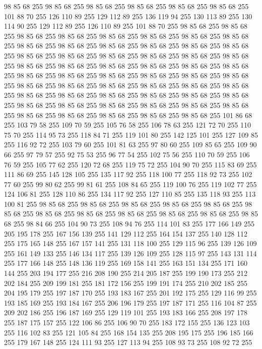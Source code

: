 98 85 68 255 98 85 68 255 98 85 68 255 98 85 68 255 98 85 68 255 98 85 68 255 101 88 70 255 126 110 89 255 129 112 89 255 136 119 94 255 130 113 89 255 130 114 90 255 129 112 89 255 126 110 89 255 101 88 70 255 98 85 68 255 98 85 68 255 98 85 68 255 98 85 68 255 98 85 68 255 98 85 68 255 98 85 68 255 98 85 68 255 98 85 68 255 98 85 68 255 98 85 68 255 98 85 68 255 98 85 68 255 98 85 68 255 98 85 68 255 98 85 68 255 98 85 68 255 98 85 68 255 98 85 68 255 98 85 68 255 98 85 68 255 98 85 68 255 98 85 68 255 98 85 68 255 98 85 68 255 98 85 68 255 98 85 68 255 98 85 68 255 98 85 68 255 98 85 68 255 98 85 68 255 98 85 68 255 98 85 68 255 98 85 68 255 98 85 68 255 98 85 68 255 98 85 68 255 98 85 68 255 98 85 68 255 98 85 68 255 98 85 68 255 98 85 68 255 98 85 68 255 98 85 68 255 98 85 68 255 98 85 68 255 98 85 68 255 98 85 68 255 98 85 68 255
98 85 68 255 98 85 68 255 98 85 68 255 98 85 68 255 98 85 68 255 98 85 68 255 101 86 68 255 103 79 58 255 109 70 59 255 105 76 58 255 106 78 63 255 121 72 70 255 110 75 70 255 114 95 73 255 118 84 71 255 119 101 80 255 142 125 101 255 127 109 85 255 116 92 72 255 103 79 60 255 101 81 63 255 97 80 60 255 109 85 65 255 109 90 66 255 97 79 57 255 92 75 53 255 96 77 54 255 102 75 56 255 110 70 59 255 106 76 59 255 105 77 62 255 120 72 68 255 119 75 72 255 104 90 70 255 115 83 69 255 111 86 69 255 145 128 105 255 135 117 92 255 118 100 77 255 118 92 73 255 102 77 60 255 99 80 62 255 99 81 61 255 108 84 65 255 119 100 76 255 119 102 77 255 124 106 81 255 128 110 86 255 134 117 92 255 127 110 85 255 135 118 93 255 113 100 81 255 98 85 68 255 98 85 68 255 98 85 68 255 98 85 68 255 98 85 68 255 98 85 68 255 98 85 68 255 98 85 68 255 98 85 68 255 98 85 68 255 98 85 68 255 98 85 68 255
98 84 66 255 104 90 73 255 108 94 76 255 114 101 83 255 177 166 149 255 205 195 178 255 167 156 139 255 141 129 112 255 164 154 137 255 140 128 112 255 175 165 148 255 167 157 141 255 131 118 100 255 129 115 96 255 139 126 109 255 161 149 133 255 146 134 117 255 139 126 109 255 128 115 97 255 143 131 114 255 177 166 148 255 148 136 119 255 169 158 141 255 163 151 134 255 171 160 144 255 203 194 177 255 216 208 190 255 214 205 187 255 199 190 173 255 212 202 184 255 209 199 181 255 181 172 156 255 199 191 174 255 210 202 185 255 204 195 179 255 197 187 170 255 193 183 167 255 201 192 175 255 129 116 99 255 193 185 169 255 193 184 167 255 206 196 179 255 197 187 171 255 116 104 87 255 209 202 186 255 196 187 169 255 129 119 101 255 193 183 166 255 208 197 178 255 187 175 157 255 122 106 86 255 106 90 70 255 183 172 155 255 136 123 103 255 116 102 83 255 121 105 84 255 168 154 135 255 208 195 175 255 196 185 166 255 179 167 148 255 124 111 93 255 127 113 94 255 108 93 73 255 108 92 72 255
